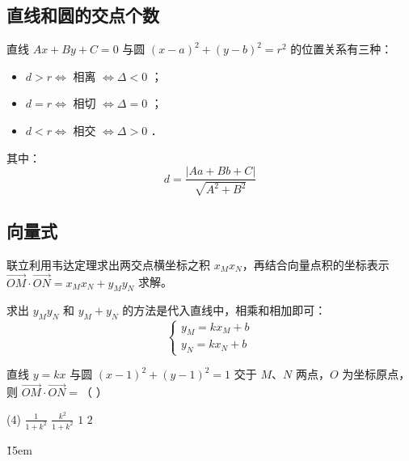 \subsection{直线和圆的交点个数}

\begin{theorem}[直线和圆的交点个数]
    直线 $A x+B y+C=0$ 与圆 $(x-a)^2+(y-b)^2=r^2$ 的位置关系有三种：
    \begin{itemize}
        \item $d>r \Leftrightarrow$ 相离 $\Leftrightarrow \Delta<0$ ；
        \item $d=r \Leftrightarrow$ 相切 $\Leftrightarrow \Delta=0$ ；
        \item $d<r \Leftrightarrow$ 相交 $\Leftrightarrow \Delta>0$ ．
    \end{itemize}
    其中：
    $$d=\frac{|A a+B b+C|}{\sqrt{A^2+B^2}}$$
\end{theorem}

\subsection{向量式}

\begin{theorem}[向量式]
    联立利用韦达定理求出两交点横坐标之积 $x_M x_N$，再结合向量点积的坐标表示 $\overrightarrow{O M} \cdot \overrightarrow{O N} = x_M x_N + y_M y_N$ 求解。

    \begin{warning}
        求出 $y_M y_N$ 和 $y_M + y_N$ 的方法是代入直线中，相乘和相加即可：
        $$
            \begin{cases}
                y_M = kx_M + b \\
                y_N = kx_N + b
            \end{cases}
        $$
    \end{warning}
\end{theorem}

\begin{example}
    直线 $y=k x$ 与圆 $(x-1)^2+(y-1)^2=1$ 交于 $M 、 N$ 两点，$O$ 为坐标原点，则 $\overrightarrow{O M} \cdot \overrightarrow{O N}=$（ \hspace{2em} ）
    \begin{tasks}(4)
        \task $\frac{1}{1+k^2}$
        \task $\frac{k^2}{1+k^2}$
        \task $1$
        \task $2$
    \end{tasks}
\end{example}

\v{15em}

